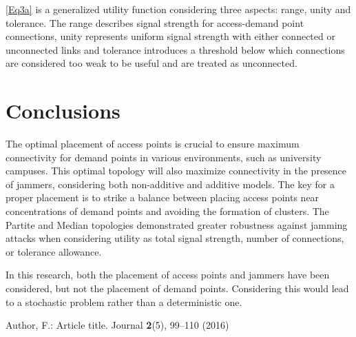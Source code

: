 \documentclass[runningheads]{llncs}
\begin{document}
	\ref{Eq3a} is a generalized utility function considering three aspects: range, unity and tolerance.
	The range describes signal strength for access-demand point connections, unity represents uniform signal strength with either connected or unconnected links and tolerance introduces a threshold below which connections are considered too weak to be useful and are treated as unconnected.
	
	
	
	\section{Conclusions}
	
	The optimal placement of access points is crucial to ensure maximum connectivity for demand points in various environments, such as university campuses. This optimal topology will also maximize connectivity in the presence of jammers, considering both non-additive and additive models.
	The key for a proper placement is to strike a balance between placing access points near concentrations of demand points and avoiding the formation of clusters.	The Partite and Median topologies demonstrated greater robustness against jamming attacks when considering utility as total signal strength, number of connections, or tolerance allowance.
	
	In this research, both the placement of access points and jammers have been considered, but not the placement of demand points. Considering this would lead to a stochastic problem rather than a deterministic one.
	
	
	\begin{thebibliography}{8}
		Author, F.: Article title. Journal \textbf{2}(5), 99--110 (2016)
		
	\end{thebibliography}
\end{document}

